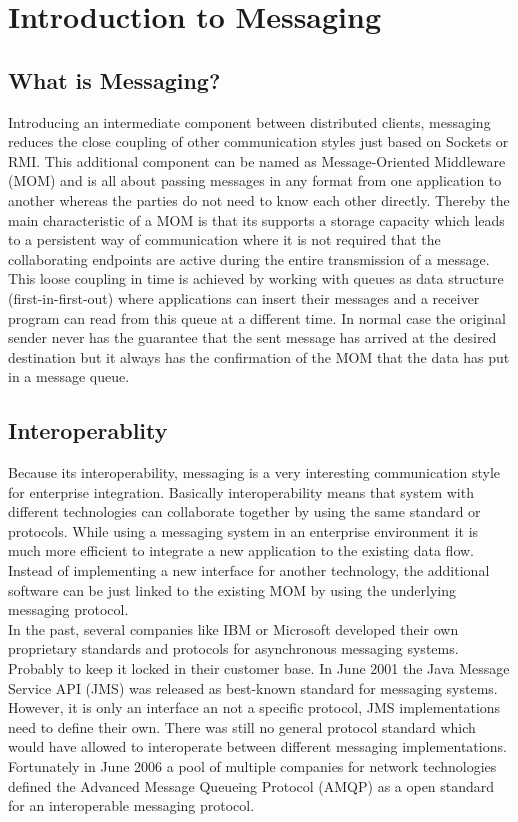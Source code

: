 \chapter{Introduction to Messaging} 
\section{What is Messaging?}
Introducing an intermediate component between distributed
clients, messaging reduces the close coupling of other communication styles just
based on \gls{Socket}s or RMI. This additional component can be named as
Message-Oriented Middleware (MOM) and is all about passing messages in any
format from one application to another whereas the parties do not need to know
each other directly. Thereby the main characteristic of a MOM is that its
supports a storage capacity which leads to a persistent way of communication where it is
not required that the collaborating endpoints are active during the entire
transmission of a message. This loose coupling in time is achieved by
working with queues as data structure (first-in-first-out) where applications
can insert their messages and a receiver program can read from this queue at a
different time. In normal case the original sender
never has the guarantee that the sent message has arrived at the desired
destination but it always has the confirmation of the MOM that the data has put
in a message queue. \cite{PprIBMIntro} \cite{TAN06}


\section{Interoperablity}
Because its interoperability, messaging is a very interesting communication
style for enterprise integration. Basically interoperability means that system with
different technologies can collaborate together by using the same standard or
protocols. While using a messaging system in an enterprise environment it is
much more efficient to integrate a new application to the existing data flow.
Instead of implementing a new interface for another technology, the additional
software can be just linked to the existing MOM by using the underlying
messaging protocol.\\

In the past, several companies like IBM or Microsoft developed their own
proprietary standards and protocols for asynchronous messaging systems.
Probably to keep it locked in their customer base. In June 2001 the Java Message
Service API (JMS) was released as best-known standard for messaging systems.
However, it is only an interface an not a specific protocol, JMS implementations
need to define their own. There was still no general protocol standard which
would have allowed to interoperate between different messaging implementations.
Fortunately in June 2006 a pool of multiple companies for network technologies
defined the Advanced Message Queueing Protocol (AMQP) as a open standard for an
interoperable messaging protocol. \cite{PrpAMQP}
 
